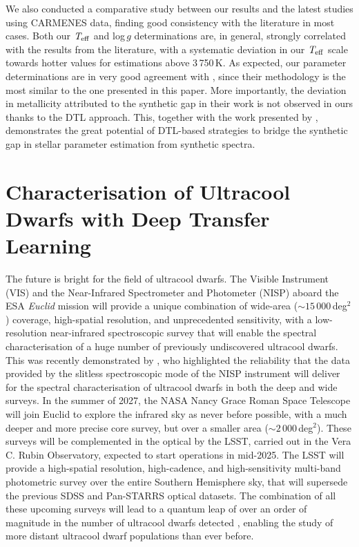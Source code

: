 We also conducted a comparative study between our results and the latest studies using CARMENES data, finding good consistency with the literature in most cases. Both our $\textit{T}_{\rm eff}$ and log\,$\textit{g}$ determinations are, in general, strongly correlated with the results from the literature, with a systematic deviation in our $\textit{T}_{\rm eff}$ scale towards hotter values for estimations above 3\,750\,K. As expected, our parameter determinations are in very good agreement with , since their methodology is the most similar to the one presented in this paper. More importantly, the deviation in metallicity attributed to the synthetic gap in their work is not observed in ours thanks to the DTL approach. This, together with the work presented by , demonstrates the great potential of DTL-based strategies to bridge the synthetic gap in stellar parameter estimation from synthetic spectra.


\chapter{Characterisation of Ultracool Dwarfs with Deep Transfer Learning} \label{chp:dtl_ucds}

The future is bright for the field of ultracool dwarfs. The Visible Instrument (VIS) and the Near-Infrared Spectrometer and Photometer (NISP) aboard the ESA \textit{Euclid} mission will provide a unique combination of wide-area ($\sim15\,000$\,deg$^2$) coverage, high-spatial resolution, and unprecedented sensitivity, with a low-resolution near-infrared spectroscopic survey that will enable the spectral characterisation of a huge number of previously undiscovered ultracool dwarfs. This was recently demonstrated by \citet{jerry2024}, who highlighted the reliability that the data provided by the slitless spectroscopic mode of the NISP instrument will deliver for the spectral characterisation of ultracool dwarfs in both the deep and wide surveys. In the summer of 2027, the NASA Nancy Grace Roman Space Telescope will join Euclid to explore the infrared sky as never before possible, with a much deeper and more precise core survey, but over a smaller area ($\sim2\,000$\,deg$^2$). These surveys will be complemented in the optical by the LSST, carried out in the Vera C. Rubin Observatory, expected to start operations in mid-2025. The LSST will provide a high-spatial resolution, high-cadence, and high-sensitivity multi-band photometric survey over the entire Southern Hemisphere sky, that will supersede the previous SDSS and Pan-STARRS optical datasets. The combination of all these upcoming surveys will lead to a quantum leap of over an order of magnitude in the number of ultracool dwarfs detected \citep{solano2021,martin2023}, enabling the study of more distant ultracool dwarf populations than ever before.

